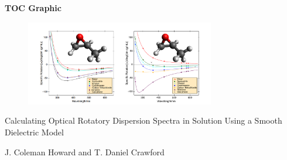 \begin{center}
 {\large \bf TOC Graphic}\\
 \begin{figure}[h]
     \includegraphics[width=3.25in]{toc.pdf}



 \end{figure}
 \vspace{2cm}
 {\large 
Calculating Optical Rotatory Dispersion Spectra in Solution Using a Smooth
Dielectric Model}
  \vspace{1.5cm} 
  
 {J. Coleman Howard and T. Daniel Crawford}
\end{center}

